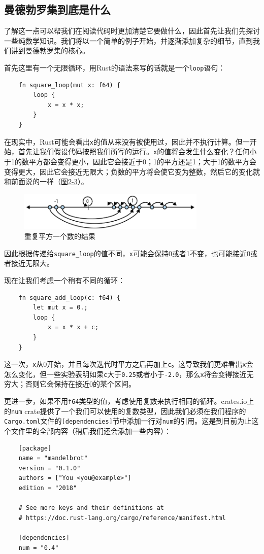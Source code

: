 \subsection{曼德勃罗集到底是什么}\label{WhatIsMand}
了解这一点可以帮我们在阅读代码时更加清楚它要做什么，因此首先让我们先探讨一些纯数学知识。我们将以一个简单的例子开始，并逐渐添加复杂的细节，直到我们讲到曼德勃罗集的核心。

首先这里有一个无限循环，用Rust的语法来写的话就是一个\texttt{loop}语句：
\begin{verbatim}
    fn square_loop(mut x: f64) {
        loop {
            x = x * x;
        }
    }
\end{verbatim}

在现实中，Rust可能会看出\texttt{x}的值从来没有被使用过，因此并不执行计算。但一开始，首先让我们假设代码按照我们所写的运行。\texttt{x}的值将会发生什么变化？任何小于1的数平方都会变得更小，因此它会接近于0；1的平方还是1；大于1的数平方会变得更大，因此它会接近无限大；负数的平方将会使它变为整数，然后它的变化就和前面说的一样（\hyperref[f2-3]{图2-3}）。
\begin{figure}[htbp]
    \centering
    \includegraphics[width=0.8\textwidth]{../img/f2-3.png}
    \caption{重复平方一个数的结果}
    \label{f2-3}
\end{figure}

因此根据传递给\texttt{square\_loop}的值不同，\texttt{x}可能会保持0或者1不变，也可能接近0或者接近无限大。

现在让我们考虑一个稍有不同的循环：
\begin{verbatim}
    fn square_add_loop(c: f64) {
        let mut x = 0.;
        loop {
            x = x * x + c;
        }
    }
\end{verbatim}

这一次，\texttt{x}从0开始，并且每次迭代时平方之后再加上\texttt{c}。这导致我们更难看出\texttt{x}会怎么变化，但一些实验表明如果\texttt{c}大于\texttt{0.25}或者小于\texttt{-2.0}，那么\texttt{x}将会变得接近无穷大；否则它会保持在接近0的某个区间。

更进一步，如果不用\texttt{f64}类型的值，考虑使用复数来执行相同的循环。crates.io上的\texttt{num} crate提供了一个我们可以使用的复数类型，因此我们必须在我们程序的\texttt{Cargo.toml}文件的\texttt{[dependencies]}节中添加一行对\texttt{num}的引用。这是到目前为止这个文件里的全部内容（稍后我们还会添加一些内容）：
\begin{verbatim}
    [package]
    name = "mandelbrot"
    version = "0.1.0"
    authors = ["You <you@example>"]
    edition = "2018"

    # See more keys and their definitions at
    # https://doc.rust-lang.org/cargo/reference/manifest.html

    [dependencies]
    num = "0.4"
\end{verbatim}

